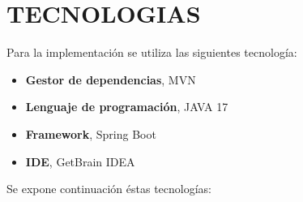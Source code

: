 \chapter*{TECNOLOGIAS}
Para la implementación se utiliza las siguientes tecnología:
\begin{itemize}
\item \textbf{Gestor de dependencias}, MVN
\item \textbf{Lenguaje de programación}, JAVA 17
\item \textbf{Framework}, Spring Boot
\item \textbf{IDE}, GetBrain IDEA
\end{itemize}
Se expone continuación éstas tecnologías:
